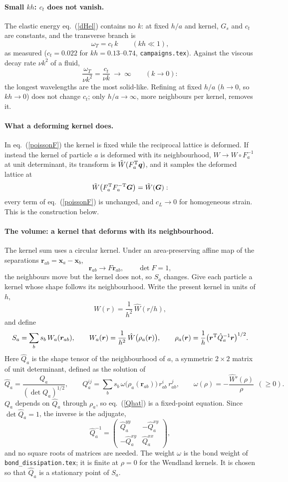 \documentclass[11pt,aps,preprint,nofootinbib,superscriptaddress,tightenlines]{revtex4-2}
\def\st{\begin{equation}}
\def\stp{\end{equation}}
\def\Eq#1{eq.~(\ref{#1})}
\let\oldparagraph\paragraph
\renewcommand{\paragraph}{\par\bigskip\oldparagraph}
\begin{document}
\paragraph{Small $kh$: $c_t$ does not vanish.}  The elastic energy \Eq{dHel} contains no $k$: at
fixed $h/a$ and kernel, $G_s$ and $c_t$ are constants, and the transverse branch is
\st
\omega_T=c_t\,k\qquad(kh\ll1),
\stp
as measured ($c_t=0.022$ for $kh=0.13$--$0.74$, \texttt{campaigns.tex}).  Against the viscous
decay rate $\nu k^2$ of a fluid,
\st
\frac{\omega_T}{\nu k^2}=\frac{c_t}{\nu k}\ \longrightarrow\ \infty\qquad(k\to0):
\stp
the longest wavelengths are the most solid-like.  Refining at fixed $h/a$ ($h\to0$, so $kh\to0$)
does not change $c_t$; only $h/a\to\infty$, more neighbours per kernel, removes it.

\paragraph{What a deforming kernel does.}  In \Eq{poissonF} the kernel is fixed while the
reciprocal lattice is deformed.  If instead the kernel of particle $a$ is deformed with its
neighbourhood, $W\to W\circ F_a^{-1}$ at unit determinant, its transform is $\tilde W(F_a^{\rm T}\bm
q)$, and it samples the deformed lattice at
\st
\tilde W\big(F_a^{\rm T}F_a^{-\rm T}\bm G\big)=\tilde W(\bm G):
\stp
every term of \Eq{poissonF} is unchanged, and $c_L\to0$ for homogeneous strain.  This is the
construction below.

\paragraph{The volume: a kernel that deforms with its neighbourhood.}  The kernel sum uses a
circular kernel.  Under an area-preserving affine map of the separations
$\bm r_{ab}=\bm x_a-\bm x_b$,
\st
\bm r_{ab}\to F\bm r_{ab},\qquad \det F=1 ,
\label{affine}
\stp
the neighbours move but the kernel does not, so $S_a$ changes.  Give each particle a kernel
whose shape follows its neighbourhood.  Write the present kernel in units of $h$,
\st
W(r)=\frac1{h^2}\,\hat W(r/h),
\stp
and define
\st
S_a=\sum_bs_b\,W_a(\bm r_{ab}),\qquad
W_a(\bm r)=\frac1{h^2}\,\hat W\big(\rho_a(\bm r)\big),\qquad
\rho_a(\bm r)=\frac1h\big(\bm r^{\rm T}\hat Q_a^{-1}\bm r\big)^{1/2}.
\label{Saniso}
\stp
Here $\hat Q_a$ is the shape tensor of the neighbourhood of $a$, a symmetric $2\times2$
matrix of unit determinant, defined as the solution of
\st
\hat Q_a=\frac{Q_a}{(\det Q_a)^{1/2}},\qquad
Q_a^{ij}=\sum_bs_b\,\omega\big(\rho_a(\bm r_{ab})\big)\,r_{ab}^i\,r_{ab}^j ,\qquad
\omega(\rho)=-\frac{\hat W'(\rho)}{\rho}\ \ (\ge0).
\label{Qhat}
\stp
$Q_a$ depends on $\hat Q_a$ through $\rho_a$, so \Eq{Qhat} is a fixed-point equation.  Since
$\det\hat Q_a=1$, the inverse is the adjugate,
\st
\hat Q_a^{-1}=\begin{pmatrix}\hat Q_a^{yy}&-\hat Q_a^{xy}\\[2pt]-\hat Q_a^{xy}&\hat Q_a^{xx}\end{pmatrix},
\stp
and no square roots of matrices are needed.  The weight $\omega$ is the bond weight of
\texttt{bond\_dissipation.tex}; it is finite at $\rho=0$ for the Wendland kernels.  It is
chosen so that $\hat Q_a$ is a stationary point of $S_a$.
\end{document}
